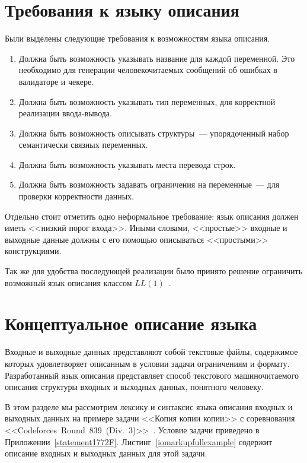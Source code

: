 \documentclass[times,specification,annotation]{style/itmo-student-thesis/itmo-student-thesis}
\begin{document}
\section{Требования к языку описания}

Были выделены следующие требования к возможностям языка описания.

\begin{enumerate}[leftmargin=1.75cm]
    \item Должна быть возможность указывать название для каждой переменной. Это необходимо для генерации человекочитаемых сообщений об ошибках в валидаторе и чекере.
    \item Должна быть возможность указывать тип переменных, для корректной реализации ввода-вывода.
    \item Должна быть возможность описывать структуры~--- упорядоченный набор семантически связных переменных.
    \item Должна быть возможность указывать места перевода строк.
    \item Должна быть возможность задавать ограничения на переменные~--- для проверки корректности данных.
\end{enumerate}

Отдельно стоит отметить одно неформальное требование: язык описания должен иметь <<низкий порог входа>>. Иными словами, <<простые>> входные и выходные данные должны с его помощью описываться <<простыми>> конструкциями.

Так же для удобства последующей реализации было принято решение ограничить возможный язык описания классом $LL(1)$~\cite{aho-compilers}.

\section{Концептуальное описание языка}\label{lang-concepts}

Входные и выходные данных представляют собой текстовые файлы, содержимое которых удовлетворяет описанным в условии задачи ограничениям и формату. Разработанный язык описания представляет способ текстового машиночитаемого описания структуры входных и выходных данных, понятного человеку. 

В этом разделе мы рассмотрим лексику и синтаксис языка описания входных и выходных данных на примере задачи <<Копия копии копии>> с соревнования <<Codeforces~Round~839~(Div.~3)>>~\cite{problem1772F}. Условие задачи приведено в Приложении~\ref{statement1772F}. Листинг~\ref{iomarkupfullexample} содержит описание входных и выходных данных для этой задачи.
\end{document}
